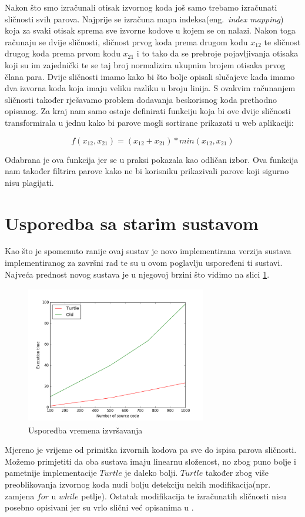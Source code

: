 Nakon što smo izračunali otisak izvornog koda još samo trebamo izračunati sličnosti svih parova. Najprije se izračuna mapa indeksa(eng.~\textit{index mapping}) koja za svaki otisak sprema sve izvorne kodove u kojem se on nalazi. Nakon toga računaju se dvije sličnosti, sličnost prvog koda prema drugom kodu $x_{12}$ te sličnost drugog koda prema prvom kodu $x_{21}$ i to tako da se prebroje pojavljivanja otisaka koji su im zajednički te se taj broj normalizira ukupnim brojem otisaka prvog člana para. Dvije sličnosti imamo kako bi što bolje opisali slučajeve kada imamo dva izvorna koda koja imaju veliku razliku u broju linija. S ovakvim računanjem sličnosti također rješavamo problem dodavanja beskorisnog koda prethodno opisanog.  Za kraj nam samo ostaje definirati funkciju koja bi ove dvije sličnosti transformirala u jednu kako bi parove mogli sortirane prikazati u web aplikaciji:

\begin{equation}
	f(x_{12}, x_{21}) = (x_{12} + x_{21}) * min(x_{12}, x_{21})
\end{equation}

\noindent Odabrana je ova funkcija jer se u praksi pokazala kao odličan izbor. Ova funkcija nam također filtrira parove kako ne bi korisniku prikazivali parove koji sigurno nisu plagijati. 

\section{Usporedba sa starim sustavom}

Kao što je spomenuto ranije ovaj sustav je novo implementirana verzija sustava implementiranog za završni rad te su u ovom poglavlju uspoređeni ti sustavi. Najveća prednost novog sustava je u njegovoj brzini što vidimo na slici \ref{fig:execution_time}.

\begin{figure}[htb]
	\centering
	\includegraphics[width=0.7\textwidth,height=6cm,keepaspectratio]{fig/execution_time.png}
	\caption{Usporedba vremena izvršavanja}
	\label{fig:execution_time}
\end{figure}

\noindent Mjereno je vrijeme od primitka izvornih kodova pa sve do ispisa parova sličnosti. Možemo primjetiti da oba sustava imaju linearnu složenost, no zbog puno bolje i pametnije implementacije $Turtle$ je daleko bolji. $Turtle$ također zbog više preoblikovanja izvornog koda nudi bolju detekciju nekih modifikacija(npr. zamjena $for$ u $while$ petlje). Ostatak modifikacija te izračunatih sličnosti nisu posebno opisivani jer su vrlo slični već opisanima u \cite{plagijator}.
